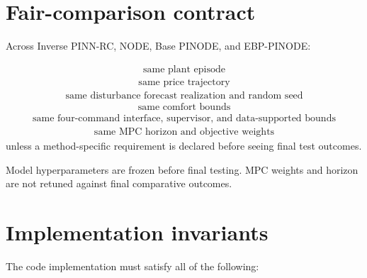 \documentclass[11pt]{article}
\begin{document}
\section{Fair-comparison contract}

Across Inverse PINN-RC, NODE, Base PINODE, and EBP-PINODE:

\begin{align}
\boxed{\text{same plant episode}}
\end{align}
\begin{align}
\boxed{\text{same price trajectory}}
\end{align}
\begin{align}
\boxed{\text{same disturbance forecast realization and random seed}}
\end{align}
\begin{align}
\boxed{\text{same comfort bounds}}
\end{align}
\begin{align}
\boxed{\text{same four-command interface, supervisor, and data-supported bounds}}
\end{align}
\begin{align}
\boxed{\text{same MPC horizon and objective weights}}
\end{align}
unless a method-specific requirement is declared before seeing final test outcomes.

Model hyperparameters are frozen before final testing.  MPC weights and horizon are not retuned
against final comparative outcomes.

\section{Implementation invariants}

The code implementation must satisfy all of the following:
\end{document}
